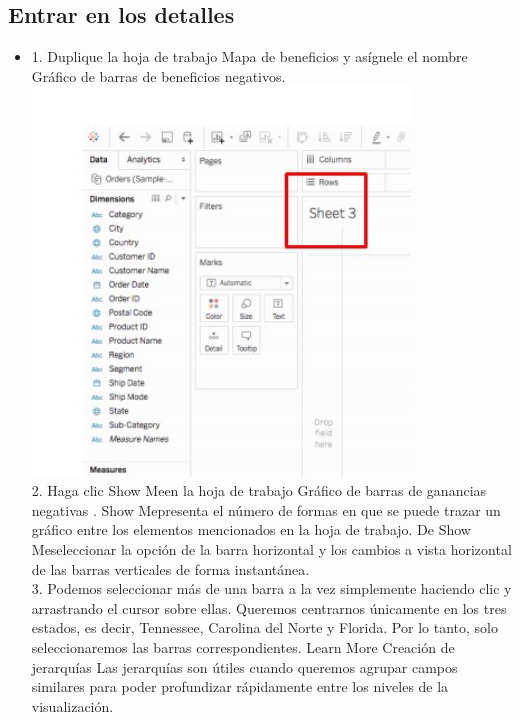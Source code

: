 \documentclass[preprint,12pt]{elsarticle}
\begin{document}
	\subsection{Entrar en los detalles}
		\begin{itemize}
			\item 
			1. Duplique la hoja de trabajo Mapa de beneficios y asígnele el nombre Gráfico de barras de
			beneficios negativos.
			\\	\includegraphics[width=10cm]{./IMAGENES/6.1}
			\\ 2. Haga clic Show Meen la hoja de trabajo Gráfico de barras de ganancias negativas . Show
			Mepresenta el número de formas en que se puede trazar un gráfico entre los elementos 
			mencionados en la hoja de trabajo. De Show Meseleccionar la opción de la barra horizontal y
			los cambios a vista horizontal de las barras verticales de forma instantánea.
			\\ 3. Podemos seleccionar más de una barra a la vez simplemente haciendo clic y arrastrando el
			cursor sobre ellas. Queremos centrarnos únicamente en los tres estados, es decir, Tennessee,
			Carolina del Norte y Florida. Por lo tanto, solo seleccionaremos las barras correspondientes.
			Learn More
			Creación de jerarquías Las
			jerarquías son útiles cuando queremos agrupar campos similares para poder profundizar
			rápidamente entre los niveles de la visualización.

\end{itemize}
\end{document}
